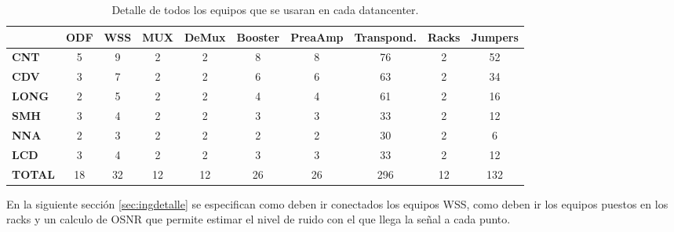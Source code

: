 \begin{table}[!hbt]
\begin{center}
\begin{tabular}{||l | c | c | c | c | c | c | c | c | c ||}
\hline
\hline
  & \textbf{ODF} & \textbf{WSS} & \textbf{MUX} & \textbf{DeMux} & \textbf{Booster} & \textbf{PreaAmp} & \textbf{Transpond.} & \textbf{Racks} & \textbf{Jumpers}  \\
\hline
\textbf{CNT} & 5 & 9 & 2 & 2 & 8 & 8 & 76 & 2 & 52\\
\hline
\textbf{CDV} & 3 & 7 & 2 & 2 & 6 & 6 & 63 & 2 & 34\\
\hline
\textbf{LONG} & 2 & 5 & 2 & 2 & 4 & 4 & 61 & 2 & 16\\
\hline
\textbf{SMH} & 3 & 4 & 2 & 2 & 3 & 3 & 33 & 2 & 12\\
\hline
\textbf{NNA} & 2 & 3 & 2 & 2 & 2 & 2 & 30 & 2 & 6\\
\hline
\textbf{LCD} & 3 & 4 & 2 & 2 & 3 & 3 & 33 & 2 & 12\\
\hline
\textbf{TOTAL} & 18 & 32 & 12 & 12 & 26 & 26 & 296 & 12 & 132\\
\hline
\end{tabular}
\caption[Total de Equipos necesarios]{Detalle de todos los equipos que se usaran en cada datancenter.}
\end{center}
\end{table}



En la siguiente sección \ref{sec:ingdetalle} se especifican como deben ir conectados los equipos WSS, como deben ir los equipos puestos en los racks y un calculo de OSNR que permite estimar el nivel de ruido con el que llega la señal a cada punto.
